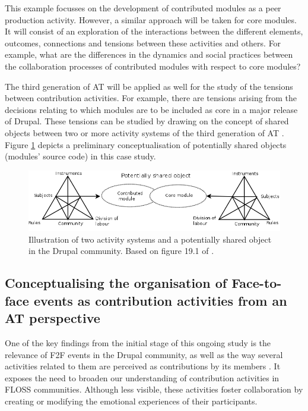 \documentclass[a4paper, 12pt]{article}
\begin{document}
This example focusses on the development of contributed modules as a peer production activity. However, a similar approach will be taken for core modules. It will consist of an exploration of the interactions between the different elements, outcomes, connections and tensions between these activities and others. For example, what are the differences in the dynamics and social practices between the collaboration processes of contributed modules with respect to core modules?

The third generation of AT will be applied as well for the study of the tensions between contribution activities. For example, there are tensions arising from the decisions relating to which modules are to be included as core in a major release of Drupal. These tensions can be studied by drawing on the concept of shared objects between two or more activity systems of the third generation of AT \parencite{engestrom_future_2009}. Figure \ref{drupal_core_contrib} depicts a preliminary conceptualisation of potentially shared objects (modules' source code) in this case study. 

\begin{figure}[h]
	\centering
	\includegraphics[scale=0.44]{diagrams/drupal_core_contrib.png}
	\caption[Conceptualisation of Drupal as a runaway object]%
	{Illustration of two activity systems and a potentially shared object in the Drupal community. Based on figure 19.1 of \textcite{engestrom_future_2009}.}
	\label{drupal_core_contrib}
\end{figure}



\subsection{Conceptualising the organisation of Face-to-face events as contribution activities from an AT perspective}
\label{subsec:dcamp-concept}

One of the key findings from the initial stage of this ongoing study is the relevance of F2F events in the Drupal community, as well as the way several activities related to them are perceived as contributions by its members \parencite{rozas2015}. It exposes the need to broaden our understanding of contribution activities in FLOSS communities. Although less visible, these activities foster collaboration by creating or modifying the emotional experiences of their participants. 
\end{document}

